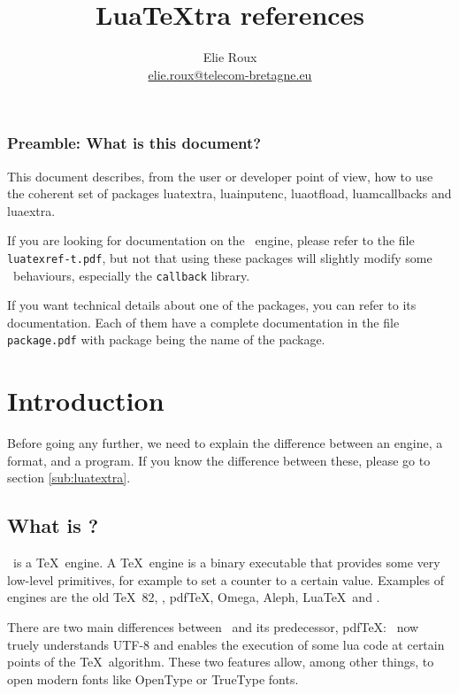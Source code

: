 \documentclass{article}
\title{Lua\TeX tra references}
\author{Elie Roux \\ \url{elie.roux@telecom-bretagne.eu}}
\makeatletter
\newlength\xxt@kern@Te
\newlength\xxt@kern@eX
\newlength\xxt@lower@e
\DeclareRobustCommand\XeTeX{%
  \leavevmode
  \smash{%
   X\lower\xxt@lower@e
   \hbox{\kern\xxt@kern@eX
   \setbox0=\hbox{E}\dimen0=\ht0\advance\dimen0by\dp0%
   \raise\dimen0\hbox{\rotatebox{180}{\box0}}%
   }\kern\xxt@kern@Te\TeX}}%
\makeatother
\begin{document}
\maketitle

\subsubsection*{Preamble: What is this document?}

This document describes, from the user or developer point of view, how to use the coherent set of packages \textsf{luatextra}, \textsf{luainputenc}, \textsf{luaotfload}, \textsf{luamcallbacks} and \textsf{luaextra}.

If you are looking for documentation on the \LuaTeX\ engine, please refer to the file \texttt{luatexref-t.pdf}, but not that using these packages will slightly modify some \LuaTeX\ behaviours, especially the \texttt{callback} library.

If you want technical details about one of the packages, you can refer to its documentation. Each of them have a complete documentation in the file \texttt{package.pdf} with package being the name of the package.

\tableofcontents

\newpage

\section{Introduction}

Before going any further, we need to explain the difference between an engine, a format, and a program. If you know the difference between these, please go to section \ref{sub:luatextra}.

\subsection{What is \LuaTeX ?}

\LuaTeX\ is a \TeX\ engine. A \TeX\ engine is a binary executable that provides some very low-level primitives, for example \texttt{\string\count} to set a counter to a certain value. Examples of engines are the old \TeX\ 82, \eTeX, pdf\TeX, Omega, Aleph, Lua\TeX\ and \XeTeX . 

There are two main differences between \LuaTeX\ and its predecessor, pdfTeX: \LuaTeX\ now truely understands UTF-8 and enables the execution of some lua code at certain points of the \TeX\ algorithm. These two features allow, among other things, to open modern fonts like OpenType or TrueType fonts.
\end{document}
